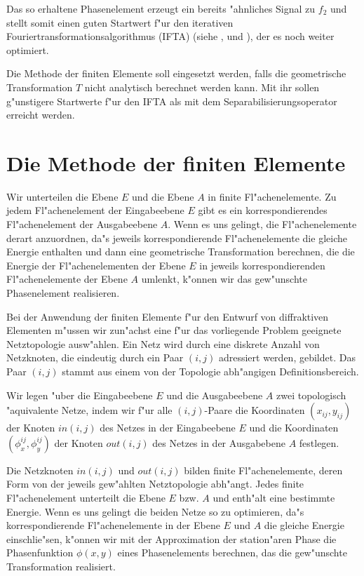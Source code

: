 \documentclass[11pt,a4paper]{article}
\begin{document}
  Das so erhaltene Phasenelement erzeugt ein bereits "ahnliches Signal zu $f_2$ und stellt somit
  einen guten Startwert f"ur den iterativen Fouriertrans\-formationsalgorithmus (IFTA) (siehe
  \cite{ifta1}, \cite{ifta2} und \cite{ifta3}), der es noch weiter optimiert.

  Die Methode der finiten Elemente soll eingesetzt werden, falls die
  geometrische Transformation $T$ nicht analytisch berechnet werden kann.
  Mit ihr sollen g"unstigere Startwerte f"ur den IFTA als mit dem 
  Separabilisierungsoperator erreicht werden.

\section{Die Methode der finiten Elemente}
  Wir unterteilen die Ebene $E$ und die Ebene
  $A$ in finite Fl"achenelemente. Zu jedem Fl"achenelement der Eingabeebene $E$ gibt es
  ein korrespondierendes Fl"achenelement der Ausgabeebene $A$. Wenn es uns gelingt, die Fl"achenelemente
  derart anzuordnen, da"s jeweils korrespondierende Fl"achenelemente die gleiche Energie enthalten und
  dann eine geometrische Transformation berechnen, die die Energie der Fl"achenelementen der
  Ebene $E$ in jeweils korrespondierenden Fl"achenelemente der Ebene $A$ umlenkt, k"onnen wir das
  gew"unschte Phasenelement realisieren. 

  Bei der Anwendung der finiten Elemente f"ur den Entwurf von 
  diffraktiven Elementen m"ussen wir zun"achst eine f"ur das vorliegende Problem 
  geeignete Netztopologie ausw"ahlen. Ein Netz wird durch eine diskrete Anzahl von
  Netzknoten, die eindeutig durch ein Paar $(i,j)$ adressiert werden, gebildet. Das Paar
  $(i,j)$ stammt aus einem von der Topologie abh"angigen Defini\-tionsbereich. 

  Wir legen "uber die Eingabeebene $E$ und die Ausgabeebene $A$ zwei topologisch "aquivalente 
  Netze, indem wir f"ur alle $(i,j)$-Paare die Koordinaten $(x_{ij},y_{ij})$ der 
  Knoten $in(i,j)$ des Netzes in der Eingabeebene $E$ und die Koordinaten 
  $(\phi_x^{ij},\phi_y^{ij})$ der Knoten $out(i,j)$ des Netzes in der Ausgabebene
  $A$ festlegen.

  Die Netzknoten $in(i,j)$ und $out(i,j)$ bilden finite Fl"achenelemente, deren Form 
  von der jeweils gew"ahlten Netztopologie abh"angt. Jedes finite Fl"achenelement
  unterteilt die Ebene $E$ bzw. $A$ und enth"alt eine bestimmte Energie. Wenn es uns gelingt
  die beiden Netze so zu optimieren, da"s korrespondierende Fl"achenelemente in der Ebene $E$ und $A$ 
  die gleiche Energie einschlie"sen, k"onnen wir mit der Approximation der station"aren Phase 
  die Phasenfunktion $\phi(x,y)$ eines Phasenelements berechnen, das die gew"unschte Transformation
  realisiert. 
\end{document}
